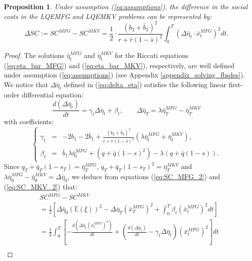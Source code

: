 \documentclass[11pt]{article}
\newtheorem{proposition}{Proposition}
\begin{document}
\begin{proposition}
	Under assumption (\ref{eq:assumptions}), the difference in the social costs in the LQEMFG and LQEMKV problems can be represented by:
	\begin{equation*}
		\Delta SC := SC^{MFG} - SC^{MKV} =  \frac{1}{2}\cdot \frac{(b_2 + \bar{b}_2)^2}{r + \bar{r}(1-\bar{s})^2} \int_0^T (\Delta \bar{\eta}_t \cdot \bar{x}_t^{MFG})^2 dt.
	\end{equation*}
\label{prop:diff_SC}
\end{proposition}
\begin{proof}
	The solutions $\bar{\eta}^{MFG}_t$ and $\bar{\eta}^{MKV}_t$ for the Riccati equations (\ref{eq:eta_bar_MFG}) and (\ref{eq:eta_bar_MKV}), respectively, are well defined under assumption (\ref{eq:assumptions}) (see Appendix \ref{appendix_solving_fbsdes}). We notice that $\Delta\bar{\eta}_t$ defined in (\ref{eq:delta_eta}) satisfies the following linear first-order differential equation:
	\begin{equation*}
		\frac{d( \Delta{\bar{\eta}}_t)}{dt} = \gamma_t \Delta\bar{\eta}_t + \beta_t,
		\qquad \Delta{\bar{\eta}}_T = \lambda \bar{\eta}_T^{MFG} - \bar{\eta}_T^{MKV}
	\end{equation*}
	with coefficients:
	\begin{equation*}
	\left\{
		\begin{array}{rcl}
			\gamma_t &=& \displaystyle -2 b_1 - 2\bar{b}_1 + \frac{(b_2 + \bar{b}_2)^2}{r + \bar{r}(1-\bar{s})^2} \left(\lambda \bar{\eta}_t^{MFG} + \bar{\eta}_t^{MKV} \right),\\
			\beta_t &=& \bar{b}_1 \lambda \bar{\eta}_t^{MFG} + (q + \bar{q}(1-s)^2) - \lambda (q + \bar{q}(1-s)).
		\end{array}
	\right.
	\end{equation*} 
	Since $q_T + \bar{q}_T(1-s_T) = \bar{\eta}_T^{MFG}$, $q_T + \bar{q}_T(1-s_T)^2 = \bar{\eta}_T^{MKV}$ and $\lambda \bar{\eta}_0^{MFG} - \bar{\eta}_0^{MKV} = \Delta\bar{\eta}_0$, we deduce from equations (\ref{eq:SC_MFG_2}) and (\ref{eq:SC_MKV_2}) that:
	\begin{equation*}
		\begin{split}
			& SC^{MFG} - SC^{MKV}\\
			&= \frac{1}{2} \left[ \Delta\bar{\eta}_0 (\mathbb{E}(\xi))^2 - \Delta\bar{\eta}_T (\bar{x}_T^{MFG})^2 + \int_0^T \beta_t (\bar{x}_t^{MFG})^2 dt \right] \\
			&= \frac{1}{2} \int_0^T \left[ - \frac{d (\Delta\bar{\eta}_t (\bar{x}_t^{MFG})^2) }{dt}  + \left( 	\frac{d( \Delta{\bar{\eta}}_t)}{dt} - \gamma_t \Delta\bar{\eta}_t  \right)(\bar{x}_t^{MFG})^2 \right] dt\\

\end{split}
\end{equation*}
\end{proof}
\end{document}
